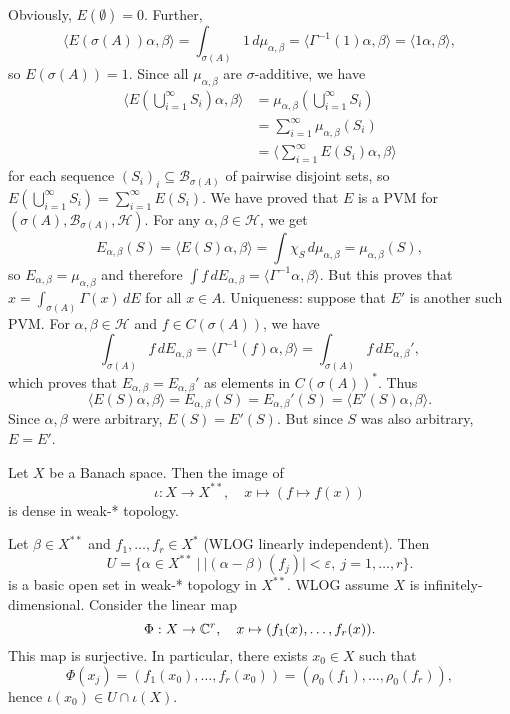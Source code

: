 \begin{myproof}
  Obviously, $E(\emptyset) = 0$. Further, 
  $$\langle E(\sigma(A)) \alpha, \beta\rangle = \int_{\sigma(A)} 1\, d\mu_{\alpha, \beta} = \langle \Gamma^{-1} (1) \alpha, \beta\rangle = \langle 1 \alpha, \beta\rangle,$$
  so $E(\sigma(A)) = 1$. Since all $\mu_{\alpha, \beta}$ are $\sigma$-additive, we have 
  \begin{align*}
    \langle E\left(\bigcup_{i = 1} ^\infty S_i\right) \alpha, \beta \rangle &= \mu_{\alpha, \beta} \left(\bigcup_{i = 1} ^\infty S_i\right)\\
    &= \sum_{i = 1} ^\infty \mu_{\alpha, \beta} (S_i)\\
    &= \langle \sum_{i = 1}^\infty E(S_i)\alpha, \beta \rangle
  \end{align*}
  for each sequence $(S_i)_i \subseteq \mathcal{B}_{\sigma(A)}$ of pairwise disjoint sets, so $E\left(\bigcup_{i = 1} ^\infty S_i\right) = \sum_{i = 1}^\infty E(S_i)$.
  We have proved that $E$ is a PVM for $(\sigma(A), \mathcal{B}_{\sigma(A)}, \mathcal{H})$. For any $\alpha, \beta \in \mathcal{H}$, we get 
  $$E_{\alpha, \beta} (S) = \langle E(S)\alpha, \beta\rangle = \int \chi_S \, d\mu_{\alpha, \beta} = \mu_{\alpha, \beta} (S),$$
  so $E_{\alpha, \beta} = \mu_{\alpha, \beta}$ and therefore $\int f\, dE_{\alpha, \beta} = \langle \Gamma^{-1} \alpha, \beta\rangle$.
  But this proves that $x = \int_{\sigma(A)} \Gamma(x)\, dE$ for all $x \in A$.
  Uniqueness: suppose that $E'$ is another such PVM. For $\alpha, \beta \in \mathcal{H}$ and $f \in C(\sigma(A))$, we have 
  $$\int_{\sigma(A)} f\, dE_{\alpha, \beta} = \langle \Gamma^{-1} (f)\alpha, \beta\rangle = \int_{\sigma(A)} f\, dE_{\alpha, \beta}',$$
  which proves that $E_{\alpha, \beta} = E_{\alpha, \beta} '$ as elements in $C(\sigma(A))^*.$
  Thus $$\langle E(S)\alpha, \beta\rangle = E_{\alpha, \beta} (S) = E_{\alpha, \beta} '(S) = \langle E'(S) \alpha, \beta \rangle.$$
  Since $\alpha, \beta$ were arbitrary, $E(S) = E'(S)$. But since $S$ was also arbitrary, $E = E'$.
\end{myproof}

\begin{lemma}
  Let $X$ be a Banach space. Then the image of 
  $$\iota: X \to X^{**},\quad x \mapsto (f \mapsto f(x))$$
  is dense in weak-* topology.
\end{lemma}

\begin{myproof}
  Let $\beta \in X^{**}$ and $f_1, \dots, f_r \in X^*$ (WLOG linearly independent).
  Then 
  $$U = \{\alpha \in X^{**}\ |\ |(\alpha - \beta) (f_j)| < \varepsilon,\ j = 1, \dots, r\}.$$
  is a basic open set in weak-* topology in $X^{**}$.
  WLOG assume $X$ is infinitely-dimensional. Consider the linear map 
  $$\Phi: X \to \mathbb {C}^r,\quad x \mapsto (f_1 (x),\dots, f_r (x)).$$
  This map is surjective.
  In particular, there exists $x_{0} \in X$ such that 
  $$\Phi(x_j) = (f_1 (x_0), \dots, f_r (x_0)) = (\rho_0 (f_1), \dots, \rho_0 (f_r)),$$
  hence $\iota (x_0) \in U \cap \iota (X)$.
\end{myproof}

